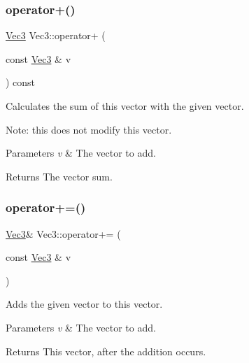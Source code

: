 \subsubsection{\texorpdfstring{operator+()}{operator+()}\hspace{0.1cm}{\footnotesize\ttfamily [2/2]}}
{\footnotesize\ttfamily \hyperlink{classVec3}{Vec3} Vec3\+::operator+ (\begin{DoxyParamCaption}\item[{const \hyperlink{classVec3}{Vec3} \&}]{v }\end{DoxyParamCaption}) const\hspace{0.3cm}{\ttfamily [inline]}}

Calculates the sum of this vector with the given vector.

Note\+: this does not modify this vector.


\begin{DoxyParams}{Parameters}
{\em v} & The vector to add. \\
\hline
\end{DoxyParams}
\begin{DoxyReturn}{Returns}
The vector sum. 
\end{DoxyReturn}
\mbox{\label{classVec3_a13b62337bd566c317958b92dc313c6c3}} 
\subsubsection{\texorpdfstring{operator+=()}{operator+=()}\hspace{0.1cm}{\footnotesize\ttfamily [1/2]}}
{\footnotesize\ttfamily \hyperlink{classVec3}{Vec3}\& Vec3\+::operator+= (\begin{DoxyParamCaption}\item[{const \hyperlink{classVec3}{Vec3} \&}]{v }\end{DoxyParamCaption})\hspace{0.3cm}{\ttfamily [inline]}}

Adds the given vector to this vector.


\begin{DoxyParams}{Parameters}
{\em v} & The vector to add. \\
\hline
\end{DoxyParams}
\begin{DoxyReturn}{Returns}
This vector, after the addition occurs. 
\end{DoxyReturn}
\mbox{\label{classVec3_a10e2ed1968402a31090cba6fe8f9250a}} 
